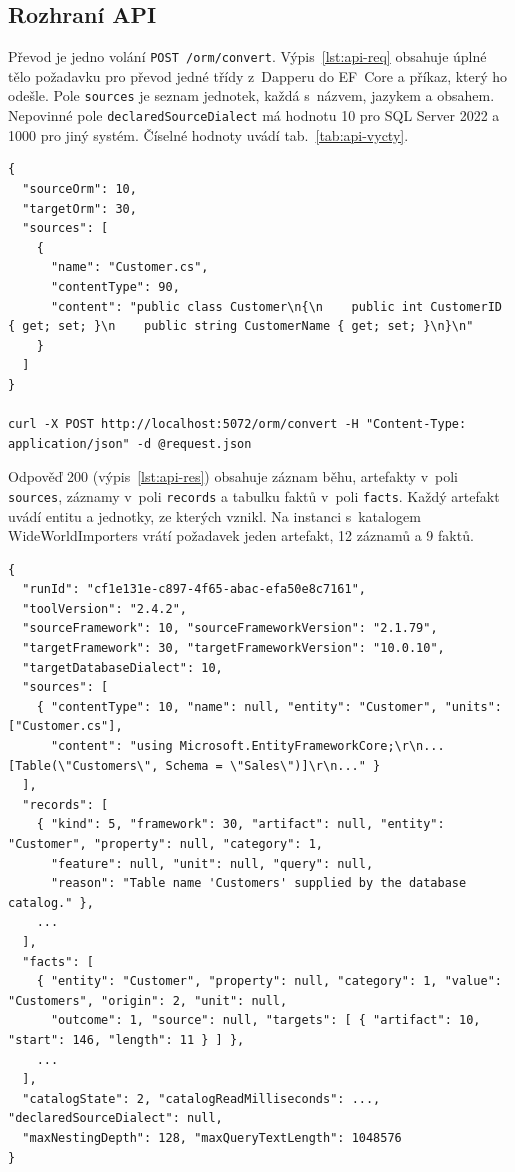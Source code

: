 \subsection{Rozhraní API}\label{sec:api}

Převod je jedno volání \texttt{POST /orm/convert}. Výpis~\ref{lst:api-req} obsahuje úplné tělo požadavku pro převod jedné třídy z~Dapperu do EF~Core a příkaz, který ho odešle. Pole \texttt{sources} je seznam jednotek, každá s~názvem, jazykem a obsahem. Nepovinné pole \texttt{declaredSourceDialect} má hodnotu 10 pro SQL Server 2022 a 1000 pro jiný systém. Číselné hodnoty uvádí tab.~\ref{tab:api-vycty}.

\noindent\begin{minipage}{\linewidth}
\begin{lstlisting}[caption={Požadavek: soubor \texttt{request.json} a jeho odeslání.},label={lst:api-req}]
{
  "sourceOrm": 10,
  "targetOrm": 30,
  "sources": [
    {
      "name": "Customer.cs",
      "contentType": 90,
      "content": "public class Customer\n{\n    public int CustomerID { get; set; }\n    public string CustomerName { get; set; }\n}\n"
    }
  ]
}

curl -X POST http://localhost:5072/orm/convert -H "Content-Type: application/json" -d @request.json
\end{lstlisting}
\end{minipage}

Odpověď 200 (výpis~\ref{lst:api-res}) obsahuje záznam běhu, artefakty v~poli \texttt{sources}, záznamy v~poli \texttt{records} a tabulku faktů v~poli \texttt{facts}. Každý artefakt uvádí entitu a jednotky, ze kterých vznikl. Na instanci s~katalogem WideWorldImporters vrátí požadavek jeden artefakt, 12 záznamů a 9 faktů.

\noindent\begin{minipage}{\linewidth}
\begin{lstlisting}[caption={Odpověď na požadavek z~výpisu~\ref{lst:api-req} (zkráceno, vynechaná místa označují tři tečky).},label={lst:api-res}]
{
  "runId": "cf1e131e-c897-4f65-abac-efa50e8c7161",
  "toolVersion": "2.4.2",
  "sourceFramework": 10, "sourceFrameworkVersion": "2.1.79",
  "targetFramework": 30, "targetFrameworkVersion": "10.0.10",
  "targetDatabaseDialect": 10,
  "sources": [
    { "contentType": 10, "name": null, "entity": "Customer", "units": ["Customer.cs"],
      "content": "using Microsoft.EntityFrameworkCore;\r\n...[Table(\"Customers\", Schema = \"Sales\")]\r\n..." }
  ],
  "records": [
    { "kind": 5, "framework": 30, "artifact": null, "entity": "Customer", "property": null, "category": 1,
      "feature": null, "unit": null, "query": null,
      "reason": "Table name 'Customers' supplied by the database catalog." },
    ...
  ],
  "facts": [
    { "entity": "Customer", "property": null, "category": 1, "value": "Customers", "origin": 2, "unit": null,
      "outcome": 1, "source": null, "targets": [ { "artifact": 10, "start": 146, "length": 11 } ] },
    ...
  ],
  "catalogState": 2, "catalogReadMilliseconds": ..., "declaredSourceDialect": null,
  "maxNestingDepth": 128, "maxQueryTextLength": 1048576
}
\end{lstlisting}
\end{minipage}

